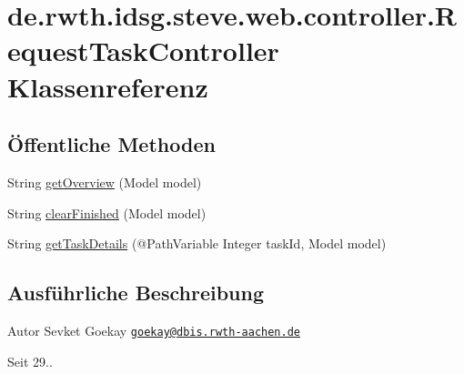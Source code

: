 \hypertarget{classde_1_1rwth_1_1idsg_1_1steve_1_1web_1_1controller_1_1_request_task_controller}{\section{de.\-rwth.\-idsg.\-steve.\-web.\-controller.\-Request\-Task\-Controller Klassenreferenz}
\label{classde_1_1rwth_1_1idsg_1_1steve_1_1web_1_1controller_1_1_request_task_controller}
}
\subsection*{Öffentliche Methoden}
\begin{DoxyCompactItemize}
\item 
String \hyperlink{classde_1_1rwth_1_1idsg_1_1steve_1_1web_1_1controller_1_1_request_task_controller_a463b436146678af3ecf36582cc3e55be}{get\-Overview} (Model model)
\item 
String \hyperlink{classde_1_1rwth_1_1idsg_1_1steve_1_1web_1_1controller_1_1_request_task_controller_ac34b1c260f8adcc3dc52b1109b740497}{clear\-Finished} (Model model)
\item 
String \hyperlink{classde_1_1rwth_1_1idsg_1_1steve_1_1web_1_1controller_1_1_request_task_controller_a626cc3b7de1d611ae178b1a403bd32f2}{get\-Task\-Details} (@Path\-Variable Integer task\-Id, Model model)
\end{DoxyCompactItemize}


\subsection{Ausführliche Beschreibung}
\begin{DoxyAuthor}{Autor}
Sevket Goekay \href{mailto:goekay@dbis.rwth-aachen.de}{\tt goekay@dbis.\-rwth-\/aachen.\-de} 
\end{DoxyAuthor}
\begin{DoxySince}{Seit}
29.. 
\end{DoxySince}


